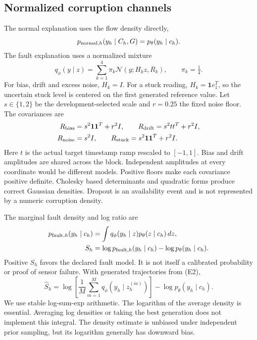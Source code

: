 \documentclass{llncs}
\newcommand{\1}{\mathbf{1}}
\begin{document}
\subsection{Normalized corruption channels}
The normal explanation uses the flow density directly,
\begin{equation}
 p_{{\rm normal},h}(y_h\mid C_h,G)=p_\theta(y_h\mid c_h).
\end{equation}
The fault explanation uses a normalized mixture
\begin{equation}
 q_\phi(y\mid z)=\sum_{k=1}^{4}\pi_k\mathcal N(y;H_kz,R_k),
 \qquad \pi_k=\tfrac14.
\end{equation}
For bias, drift and excess noise, $H_k=I$. For a stuck reading, $H_k=\1 e_1^T$, so the uncertain stuck level is centered on the first generated reference value. Let $s\in\{1,2\}$ be the development-selected scale and $r=0.25$ the fixed noise floor. The covariances are
\[
\begin{split}
 R_{\rm bias}&=s^2\1\1^T+r^2I,\qquad
 R_{\rm drift}=s^2tt^T+r^2I,\\
 R_{\rm noise}&=s^2I,\qquad
 R_{\rm stuck}=s^2\1\1^T+r^2I.
\end{split}
\]
Here $t$ is the actual target timestamp ramp rescaled to $[-1,1]$. Bias and drift amplitudes are shared across the block. Independent amplitudes at every coordinate would be different models. Positive floors make each covariance positive definite. Cholesky based determinants and quadratic forms produce correct Gaussian densities. Dropout is an availability event and is not represented by a numeric corruption density.

The marginal fault density and log ratio are
\begin{align}
 p_{{\rm fault},h}(y_h\mid c_h)&=\int q_\phi(y_h\mid z)p_\theta(z\mid c_h)\,dz, \\
 S_h&=\log p_{{\rm fault},h}(y_h\mid c_h)-\log p_\theta(y_h\mid c_h).
\end{align}
Positive $S_h$ favors the declared fault model. It is not itself a calibrated probability or proof of sensor failure. With generated trajectories from (E2),
\begin{equation}
 \widehat S_h=\log\left[\frac{1}{M}\sum_{m=1}^{M}q_\phi(y_h\mid z_h^{(m)})\right]
 -\log p_\theta(y_h\mid c_h).
\end{equation}
We use stable log-sum-exp arithmetic. The logarithm of the average density is essential. Averaging log densities or taking the best generation does not implement this integral. The density estimate is unbiased under independent prior sampling, but its logarithm generally has downward bias.
\end{document}
